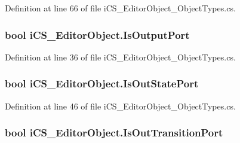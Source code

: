 Definition at line 66 of file i\+C\+S\+\_\+\+Editor\+Object\+\_\+\+Object\+Types.\+cs.

\hypertarget{classi_c_s___editor_object_a55f0a2ae3ead8136403c7946ed9ba470}{
\subsubsection[{Is\+Output\+Port}]{\setlength{\rightskip}{0pt plus 5cm}bool i\+C\+S\+\_\+\+Editor\+Object.\+Is\+Output\+Port\hspace{0.3cm}{\ttfamily [get]}}}\label{classi_c_s___editor_object_a55f0a2ae3ead8136403c7946ed9ba470}


Definition at line 36 of file i\+C\+S\+\_\+\+Editor\+Object\+\_\+\+Object\+Types.\+cs.

\hypertarget{classi_c_s___editor_object_a3eb66212b4169bfa0e3960ee164719a3}{
\subsubsection[{Is\+Out\+State\+Port}]{\setlength{\rightskip}{0pt plus 5cm}bool i\+C\+S\+\_\+\+Editor\+Object.\+Is\+Out\+State\+Port\hspace{0.3cm}{\ttfamily [get]}}}\label{classi_c_s___editor_object_a3eb66212b4169bfa0e3960ee164719a3}


Definition at line 46 of file i\+C\+S\+\_\+\+Editor\+Object\+\_\+\+Object\+Types.\+cs.

\hypertarget{classi_c_s___editor_object_a878eb3d28629792baf44e711fb0cb980}{
\subsubsection[{Is\+Out\+Transition\+Port}]{\setlength{\rightskip}{0pt plus 5cm}bool i\+C\+S\+\_\+\+Editor\+Object.\+Is\+Out\+Transition\+Port\hspace{0.3cm}{\ttfamily [get]}}}\label{classi_c_s___editor_object_a878eb3d28629792baf44e711fb0cb980}



